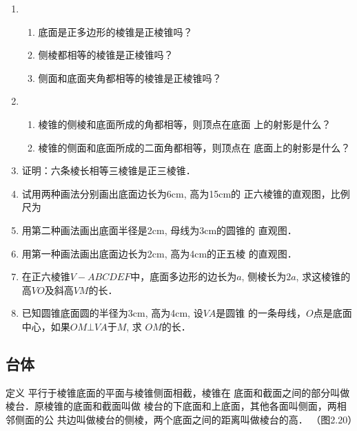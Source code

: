 \begin{ex}
\begin{enumerate}
    \item \begin{enumerate}
        \item 底面是正多边形的棱锥是正棱锥吗？
    \item 侧棱都相等的棱锥是正棱锥吗？
    \item 侧面和底面夹角都相等的棱锥是正棱锥吗？
    \end{enumerate}
  
    \item 
    \begin{enumerate}
      \item 棱锥的侧棱和底面所成的角都相等，则顶点在底面
    上的射影是什么？
    \item 棱锥的侧面和底面所成的二面角都相等，则顶点在
    底面上的射影是什么？  
    \end{enumerate}
    
    \item 证明：六条棱长相等三棱锥是正三棱锥．
    \item 试用两种画法分别画出底面边长为6cm, 高为15cm的
    正六棱锥的直观图，比例尺为
    \item 用第二种画法画出底面半径是2cm, 母线为3cm的圆锥的
    直观图．
    \item 用第一种画法画出底面边长为2cm, 高为4cm的正五棱
    的直观图．
    \item 在正六棱锥$V-ABCDEF$中，底面多边形的边长为$a$,
    侧棱长为$2a$, 求这棱锥的高$VO$及斜高$VM$的长．
    \item 已知圆锥底面圆的半径为3cm, 高为4cm, 设$VA$是圆锥
    的一条母线，$O$点是底面中心，如果$OM\bot VA$于$M$, 求
    $OM$的长．
\end{enumerate}
\end{ex}

\subsection{台体}
\begin{blk}{定义}
    平行于棱锥底面的平面与棱锥侧面相截，棱锥在
底面和截面之间的部分叫做棱台．原棱锥的底面和截面叫做
棱台的下底面和上底面，其他各面叫侧面，两相邻侧面的公
共边叫做棱台的侧棱，两个底面之间的距离叫做棱台的高．
（图2.20）
\end{blk}

